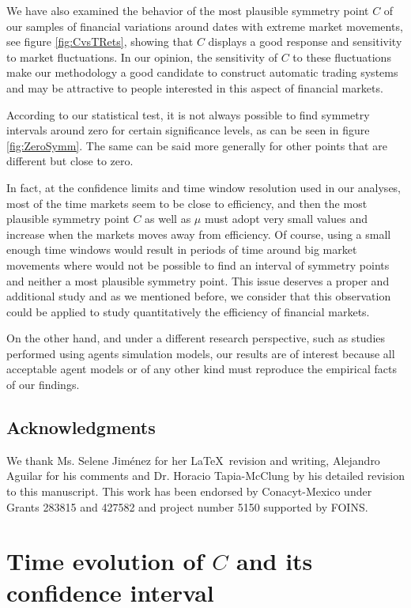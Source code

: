 \documentclass{elsarticle}
\begin{document}
We have also examined the behavior of the most plausible symmetry point $C$ of our samples of financial variations around dates with extreme market movements, see figure \ref{fig:CvsTRets}, showing that $C$ displays a good response and sensitivity to market fluctuations. In our opinion, the sensitivity of $C$ to these fluctuations make our methodology a good candidate to construct automatic trading systems and may
be attractive to people interested in this aspect of financial markets.

According to our statistical test, it is not always possible to find symmetry intervals around zero for certain  significance levels, as can be seen in figure \ref{fig:ZeroSymm}. The same can be said more generally for other points that are different but close to zero.

In fact, at the confidence limits  and  time window resolution used in our analyses, most of the time markets seem to be close to efficiency, and then the most plausible symmetry point $C$ as well as $\mu$ must adopt very small values and increase when the markets moves away from efficiency. Of course, using a small enough time windows would result in periods of time around big market movements  where would  not be  possible to find an interval of symmetry points and neither a most plausible symmetry point. This issue  deserves a proper and additional study and as we mentioned before, we consider that this observation could be applied to study quantitatively the efficiency of financial markets.

On the other hand, and under a different research perspective, such as studies performed using
agents simulation models, our  results are of interest because all acceptable agent models or of
any other kind must reproduce the empirical facts of our findings.

\subsection*{\bf Acknowledgments}

We thank  Ms. Selene Jim\'enez for her \LaTeX \, revision and writing, Alejandro Aguilar for his comments and Dr. Horacio Tapia-McClung by his detailed revision to this manuscript.
This work has been endorsed by Conacyt-Mexico under Grants 283815 and 427582 and project number 5150 supported by FOINS.

\appendix

\section{Time evolution of $C$ and its confidence interval}
\label{appendixa}
\end{document}

